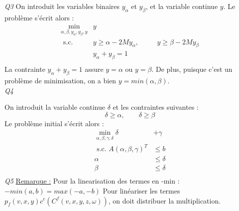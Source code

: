\documentclass[a4paper,12pt]{article}
\begin{document}
    \textit{Q3 }
    On introduit les variables binaires $y_\alpha$ et $y_\beta$, et la variable continue $y$.
    Le problème s'écrit alors :
    \begin{equation}
        \begin{alignedat}{2}
            \min _{\alpha, \beta, y_\alpha, y_\beta, y} & y \\
            \text{ s.c. } 
            &y \geq \alpha - 2M y_\alpha, & \quad& y \geq \beta - 2M y_\beta \\
            &y_\alpha + y_\beta = 1 \\
        \end{alignedat}
    \end{equation}
    La contrainte $y_\alpha + y_\beta = 1$ assure  $y = \alpha$ ou $y = \beta$.
    De plus, puisque c'est un problème de minimisation, on a bien $y = min(\alpha, \beta)$. \\
    \textit{Q4 }

    On introduit la variable continue $\delta$ et les contraintes suivantes :
    $$ \delta \geq \alpha, \qquad \delta \geq \beta $$
    Le problème initial s'écrit alors :
    \begin{equation}
        \begin{aligned}
            \min _{\alpha, \beta, \gamma, \delta}  \delta &+ \gamma \\
            \text{ s.c. }  A(\alpha, \beta, \gamma)^T &\leq b \\
            \alpha &\leq \delta \\
            \beta &\leq \delta \\
        \end{aligned}
    \end{equation}
    \textit{Q5 }
    \underline{Remarque :} Pour la linearisation des termes en -min : $-min(a,b) = max(-a,-b)$
    Pour linéariser les termes $p_f(v, x, y) c^c(C^f(v, x, y, z ,\omega))$, on doit distribuer la multiplication.
\end{document}
